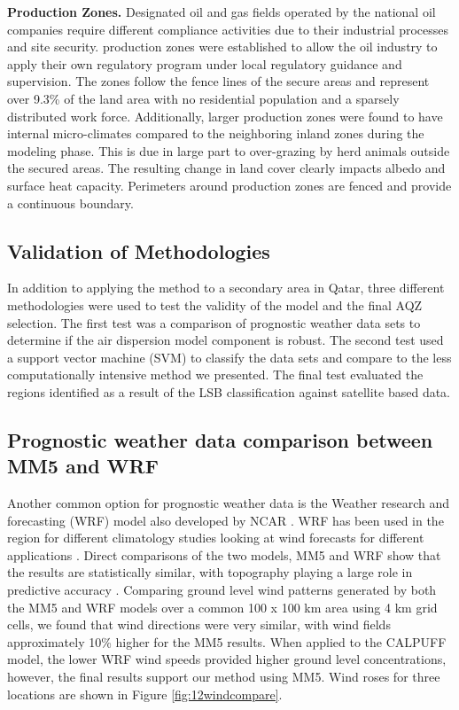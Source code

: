 \textbf{Production Zones.} Designated oil and gas fields operated by the national oil companies require different compliance activities due to their industrial processes and site security.  production zones were established to allow the oil industry to apply their own regulatory program under local regulatory guidance and supervision. The zones follow the fence lines of the secure areas and represent over 9.3\% of the land area with no residential population and a sparsely distributed work force. Additionally, larger production zones were found to have internal micro-climates compared to the neighboring inland zones during the modeling phase.  This is due in large part to over-grazing by herd animals outside the secured areas.  The resulting change in land cover clearly impacts albedo and surface heat capacity. Perimeters around production zones are fenced and provide a continuous boundary.

\subsection{Validation of Methodologies}

In addition to applying the method to a secondary area in Qatar, three different methodologies were used to test the validity of the model and the final AQZ selection. The first test was a comparison of prognostic weather data sets to determine if the air dispersion model component is robust. The second test used a support vector machine (SVM) to classify the data sets and compare to the less computationally intensive method we presented. The final test evaluated the regions identified as a result of the LSB classification against satellite based data.

\subsection{Prognostic weather data comparison between MM5 and WRF}

Another common option for prognostic weather data is the Weather research and forecasting (WRF) model also developed by NCAR \citep{Skamarock2008}. WRF has been used in the region for different climatology studies looking at wind forecasts for different applications \citep{Amjad2015}. Direct comparisons of the two models, MM5 and WRF show that the results are statistically similar, with topography playing a large role in predictive accuracy \citep{Gsella2014, Henmi2004}. Comparing ground level wind patterns generated by both the MM5 and WRF models over a common 100 x 100 km area using 4 km grid cells, we found that wind directions were very similar, with wind fields approximately 10\% higher for the MM5 results. When applied to the CALPUFF model, the lower WRF wind speeds provided higher ground level concentrations, however, the final results support our method using MM5. Wind roses for three locations are shown in Figure \ref{fig:12windcompare}.
 	 
